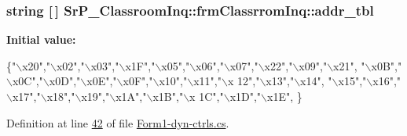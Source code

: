 \hypertarget{class_sr_p___classroom_inq_1_1frm_classrrom_inq_a0f417902be6534cb30d93b2c0d836165}{
\subsubsection[{addr\-\_\-tbl}]{\setlength{\rightskip}{0pt plus 5cm}string \mbox{[}$\,$\mbox{]} {\bf \-Sr\-P\-\_\-\-Classroom\-Inq\-::frm\-Classrrom\-Inq\-::addr\-\_\-tbl}}}
\label{class_sr_p___classroom_inq_1_1frm_classrrom_inq_a0f417902be6534cb30d93b2c0d836165}
{\bfseries \-Initial value\-:}
\begin{DoxyCode}
 \{\textcolor{stringliteral}{"\(\backslash\)x20"},\textcolor{stringliteral}{"\(\backslash\)x02"},\textcolor{stringliteral}{"\(\backslash\)x03"},\textcolor{stringliteral}{"\(\backslash\)x1F"},\textcolor{stringliteral}{"\(\backslash\)x05"},\textcolor{stringliteral}{"\(\backslash\)x06"},\textcolor{stringliteral}{"\(\backslash\)x07"},\textcolor{stringliteral}{"\(\backslash\)x22"},\textcolor{stringliteral}{"\(\backslash\)x09"},\textcolor{stringliteral}{"\(\backslash\)x21"},
                           \textcolor{stringliteral}{"\(\backslash\)x0B"},\textcolor{stringliteral}{"\(\backslash\)x0C"},\textcolor{stringliteral}{"\(\backslash\)x0D"},\textcolor{stringliteral}{"\(\backslash\)x0E"},\textcolor{stringliteral}{"\(\backslash\)x0F"},\textcolor{stringliteral}{"\(\backslash\)x10"},\textcolor{stringliteral}{"\(\backslash\)x11"},\textcolor{stringliteral}{"\(\backslash\)x
      12"},\textcolor{stringliteral}{"\(\backslash\)x13"},\textcolor{stringliteral}{"\(\backslash\)x14"},
                           \textcolor{stringliteral}{"\(\backslash\)x15"},\textcolor{stringliteral}{"\(\backslash\)x16"},\textcolor{stringliteral}{"\(\backslash\)x17"},\textcolor{stringliteral}{"\(\backslash\)x18"},\textcolor{stringliteral}{"\(\backslash\)x19"},\textcolor{stringliteral}{"\(\backslash\)x1A"},\textcolor{stringliteral}{"\(\backslash\)x1B"},\textcolor{stringliteral}{"\(\backslash\)x
      1C"},\textcolor{stringliteral}{"\(\backslash\)x1D"},\textcolor{stringliteral}{"\(\backslash\)x1E"},
                            \}
\end{DoxyCode}


\-Definition at line \hyperlink{_form1-dyn-ctrls_8cs_source_l00042}{42} of file \hyperlink{_form1-dyn-ctrls_8cs_source}{\-Form1-\/dyn-\/ctrls.\-cs}.

